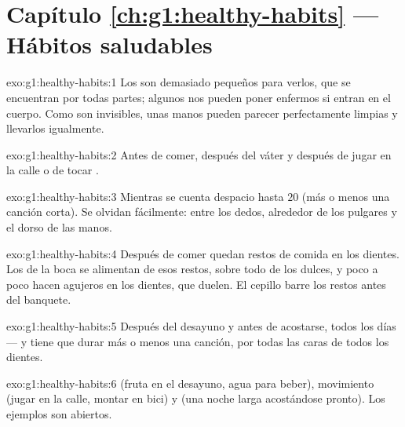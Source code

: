\section*{Capítulo \ref{ch:g1:healthy-habits} --- Hábitos saludables}

\begin{solution}{exo:g1:healthy-habits:1}
Los  son  demasiado pequeños para verlos, que se
encuentran por todas partes; algunos nos pueden poner enfermos si
entran en el cuerpo. Como son invisibles, unas manos pueden parecer
perfectamente limpias y llevarlos igualmente.
\end{solution}

\begin{solution}{exo:g1:healthy-habits:2}
Antes de comer, después del váter y después de jugar en la calle o de
tocar .
\end{solution}

\begin{solution}{exo:g1:healthy-habits:3}
Mientras se cuenta despacio hasta $20$ (más o menos una canción
corta). Se olvidan fácilmente: entre los dedos, alrededor de los
pulgares y el dorso de las manos.
\end{solution}

\begin{solution}{exo:g1:healthy-habits:4}
Después de comer quedan restos de comida en los dientes. Los 
de la boca se alimentan de esos restos, sobre todo de los dulces, y
poco a poco hacen agujeros en los dientes, que duelen. El cepillo
barre los restos antes del banquete.
\end{solution}

\begin{solution}{exo:g1:healthy-habits:5}
Después del desayuno y antes de acostarse, todos los días --- y tiene
que durar más o menos una canción, por todas las caras de todos los dientes.
\end{solution}

\begin{solution}{exo:g1:healthy-habits:6}
 (fruta en el desayuno, agua para beber), movimiento
(jugar en la calle, montar en bici) y  (una noche larga
acostándose pronto). Los ejemplos son abiertos.
\end{solution}

